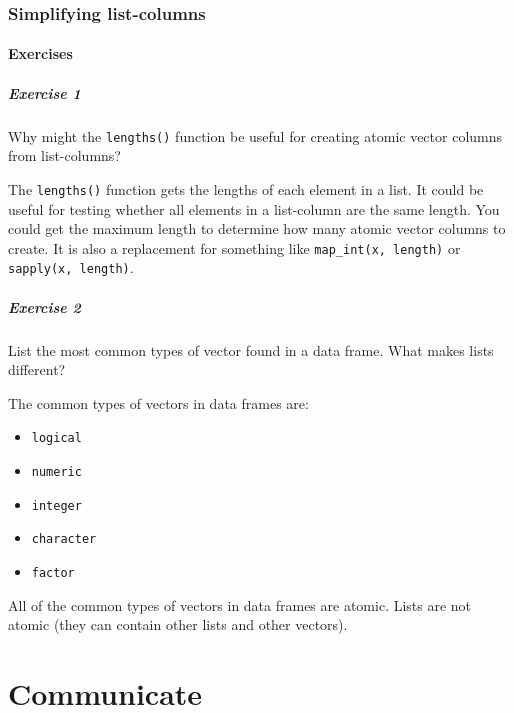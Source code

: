 \documentclass[]{book}
\providecommand{\tightlist}{%
  \setlength{\itemsep}{0pt}\setlength{\parskip}{0pt}}
\theoremstyle{definition}
\theoremstyle{definition}
\theoremstyle{definition}
\theoremstyle{remark}
\begin{document}
\hypertarget{simplifying-list-columns}{%
\section{Simplifying list-columns}\label{simplifying-list-columns}}

\hypertarget{exercises-5}{%
\subsection{Exercises}\label{exercises-5}}

\hypertarget{exercise-1-64}{%
\subsubsection{Exercise 1}\label{exercise-1-64}}

Why might the \texttt{lengths()} function be useful for creating atomic
vector columns from list-columns?

The \texttt{lengths()} function gets the lengths of each element in a
list. It could be useful for testing whether all elements in a
list-column are the same length. You could get the maximum length to
determine how many atomic vector columns to create. It is also a
replacement for something like \texttt{map\_int(x,\ length)} or
\texttt{sapply(x,\ length)}.

\hypertarget{exercise-2-63}{%
\subsubsection{Exercise 2}\label{exercise-2-63}}

List the most common types of vector found in a data frame. What makes
lists different?

The common types of vectors in data frames are:

\begin{itemize}
\tightlist
\item
  \texttt{logical}
\item
  \texttt{numeric}
\item
  \texttt{integer}
\item
  \texttt{character}
\item
  \texttt{factor}
\end{itemize}

All of the common types of vectors in data frames are atomic. Lists are
not atomic (they can contain other lists and other vectors).

\hypertarget{part-communicate}{%
\part{Communicate}\label{part-communicate}}
\end{document}
